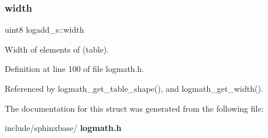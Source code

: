 \subsubsection{width}
{\footnotesize\ttfamily uint8 logadd\+\_\+s\+::width}



Width of elements of (table). 



Definition at line 100 of file logmath.\+h.



Referenced by logmath\+\_\+get\+\_\+table\+\_\+shape(), and logmath\+\_\+get\+\_\+width().



The documentation for this struct was generated from the following file\+:\begin{DoxyCompactItemize}
\item 
include/sphinxbase/\textbf{ logmath.\+h}\end{DoxyCompactItemize}
